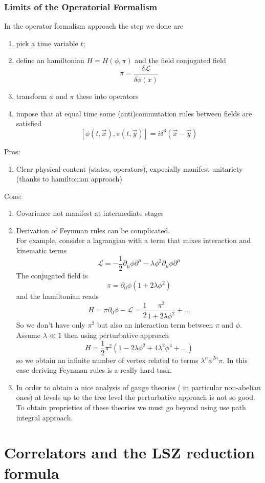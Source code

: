 \documentclass[../main/main.tex]{subfiles}
\begin{document}
\subsubsection{Limits of the Operatorial Formalism}
In the operator formalism approach the step we done are
\begin{enumerate}
\item pick a time variable $t$;
\item define an hamiltonian $H=H(\phi, \pi)$ and the field conjugated field 
\[\pi=\frac{\delta\mathcal L}{\delta\dot\phi(x)}\]
\item transform $\phi$ and $\pi$ these into operators
\item impose that at equal time some (anti)commutation rules between fields are satisfied
\[[\phi(t,\vec x),\pi(t,\vec y)]=i\delta^3(\vec x-\vec y)\]
\end{enumerate}
Pros: 
\begin{enumerate}
\item Clear physical content (states, operators), expecially manifest unitariety (thanks to hamiltonian approach)
\end{enumerate}
Cons:
\begin{enumerate}
\item Covariance not manifest at intermediate stages
\item Derivation of Feynman rules can be complicated.\\
For example, consider a lagrangian with a term that mixes interaction and kinematic terms
\[\mathcal L =-\frac12\partial_\mu\phi\partial^\mu-\lambda\phi^2\partial_\mu\phi\partial^\mu\]
The conjugated field is 
\[\pi=\partial_0\phi(1+2\lambda\phi^2)\]
and the hamiltonian reads
\[H=\pi\partial_0\phi-\mathcal L=\frac12\frac{\pi^2}{1+2\lambda\phi^2}+\dots\]
So we don't have only $\pi^2$ but also an interaction term between $\pi$ and $\phi$. Assume $\lambda\ll1$ then using perturbative approach
\[H=\frac12\pi^2(1-2\lambda\phi^2+4\lambda^2\phi^4+\dots)\]
so we obtain an infinite number of vertex related to terms $\lambda^n\phi^{2n}\pi$.
In this case deriving Feynman rules is a really hard task.
\item  In order to obtain a nice analysis of gauge theories ( in particular non-abelian ones) at levels up to the tree level the perturbative approach is not so good. To obtain proprieties of these theories we must go beyond using use path integral approach.
\end{enumerate}


\section{Correlators and the LSZ reduction formula}
\end{document}

